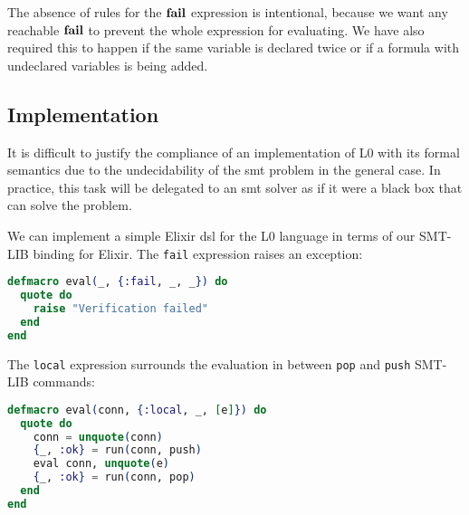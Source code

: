 \bigskip

\begin{prooftree}
\end{prooftree}

\bigskip

\begin{prooftree}
\end{prooftree}

\bigskip

The absence of rules for the $\failE$ expression is intentional, because we
want any reachable $\failE$ to prevent the whole expression for evaluating.
We have also required this to happen if the same variable is declared twice
or if a formula with undeclared variables is being added.

\subsection{Implementation}
\label{integ:l0implementation}

It is difficult to justify the compliance of an implementation of L0 with its
formal semantics due to the undecidability of the \gls{smt} problem in the 
general case. In practice, this task will be delegated to an \acrshort{smt} 
solver as if it were a black box that can solve the problem.

We can implement a simple Elixir \gls{dsl} for the L0 language in terms of our
SMT-LIB binding for Elixir. The \verb|fail| expression raises an exception:

\begin{lstlisting}[language=elixir,numbers=none,frame=none]
defmacro eval(_, {:fail, _, _}) do
  quote do
    raise "Verification failed"
  end
end
\end{lstlisting}

The \verb|local| expression surrounds the evaluation in between
\verb|pop| and \verb|push| SMT-LIB commands:

\begin{lstlisting}[language=elixir,numbers=none,frame=none]
defmacro eval(conn, {:local, _, [e]}) do
  quote do
    conn = unquote(conn)
    {_, :ok} = run(conn, push)
    eval conn, unquote(e)
    {_, :ok} = run(conn, pop)
  end
end
\end{lstlisting}

